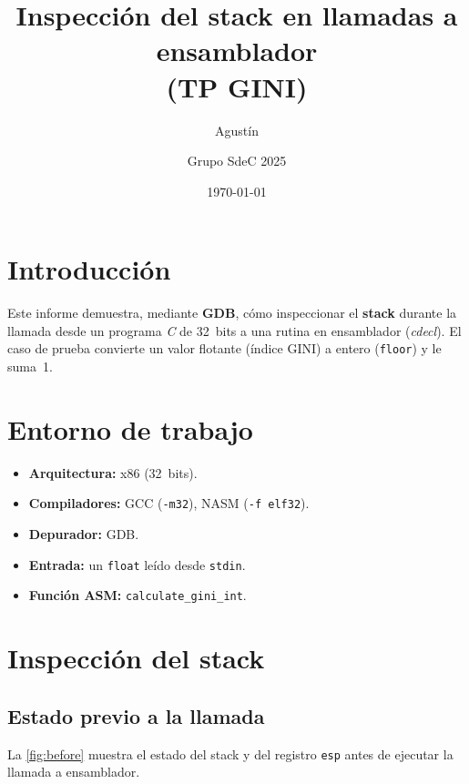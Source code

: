 \documentclass[a4paper,12pt]{article}
\title{\textbf{Inspección del stack en llamadas a ensamblador\\(TP GINI)}}
\author{Agustín \and Grupo SdeC 2025}
\date{\today}
\begin{document}
\maketitle

\section{Introducción}
Este informe demuestra, mediante \textbf{GDB}, cómo inspeccionar el
\textbf{stack} durante la llamada desde un programa \emph{C} de 32 bits a
una rutina en ensamblador (\emph{cdecl}).  
El caso de prueba convierte un valor flotante (índice GINI) a entero
(\texttt{floor}) y le suma~1.

\section{Entorno de trabajo}
\begin{itemize}
  \item \textbf{Arquitectura:} x86 (32 bits).
  \item \textbf{Compiladores:} GCC (\texttt{-m32}), NASM (\texttt{-f elf32}).
  \item \textbf{Depurador:} GDB.
  \item \textbf{Entrada:} un \texttt{float} leído desde \texttt{stdin}.
  \item \textbf{Función ASM:} \texttt{calculate\_gini\_int}.
\end{itemize}

\section{Inspección del stack}
\subsection{Estado previo a la llamada}
La \cref{fig:before} muestra el estado del stack y del registro \texttt{esp}
antes de ejecutar la llamada a ensamblador.
\end{document}
